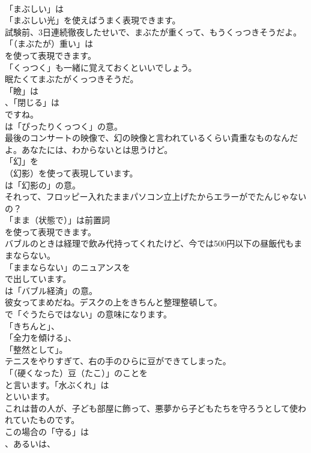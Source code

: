 \documentclass[8pt]{extreport}
\begin{document}
\begin{CJK}{UTF8}{min}
\\	「まぶしい」は
\\	「まぶしい光」を使えばうまく表現できます。	
\\	試験前、3日連続徹夜したせいで、まぶたが重くって、もうくっつきそうだよ。 
\\	「（まぶたが）重い」は
\\	を使って表現できます。
\\	「くっつく」も一緒に覚えておくといいでしょう。	
\\	眠たくてまぶたがくっつきそうだ。 
\\	「瞼」は
\\	、「閉じる」は
\\	ですね。
\\	は「ぴったりくっつく」の意。	
\\	最後のコンサートの映像で、幻の映像と言われているくらい貴重なものなんだよ。あなたには、わからないとは思うけど。 
\\	「幻」を 
\\	（幻影）を使って表現しています。
\\	は「幻影の」の意。	
\\	それって、フロッピー入れたままパソコン立上げたからエラーがでたんじゃないの？ 
\\	「まま（状態で）」は前置詞
\\	を使って表現できます。	
\\	バブルのときは経理で飲み代持ってくれたけど、今では500円以下の昼飯代もままならない。 
\\	「ままならない」のニュアンスを 
\\	で出しています。
\\	は「バブル経済」の意。	
\\	彼女ってまめだね。デスクの上をきちんと整理整頓して。 
\\	で「ぐうたらではない」の意味になります。
\\	「きちんと」、
\\	「全力を傾ける」、
\\	「整然として」。	
\\	テニスをやりすぎて、右の手のひらに豆ができてしまった。 
\\	「（硬くなった）豆（たこ）」のことを
\\	と言います。「水ぶくれ」は
\\	といいます。	
\\	これは昔の人が、子ども部屋に飾って、悪夢から子どもたちを守ろうとして使われていたものです。 
\\	この場合の「守る」は 
\\	、あるいは、

\end{CJK}
\end{document}
